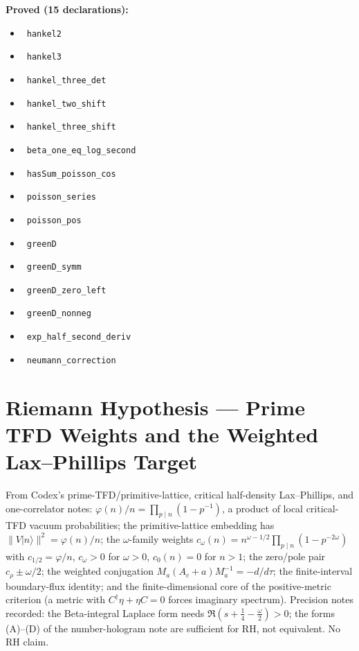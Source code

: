\documentclass{report}
\theoremstyle{definition}
\begin{document}
\noindent\textbf{Proved (15 declarations):}
\begin{itemize}
  \item {}\leanok\ \texttt{hankel2}
  \item {}\leanok\ \texttt{hankel3}
  \item {}\leanok\ \texttt{hankel\_three\_det}
  \item {}\leanok\ \texttt{hankel\_two\_shift}
  \item {}\leanok\ \texttt{hankel\_three\_shift}
  \item {}\leanok\ \texttt{beta\_one\_eq\_log\_second}
  \item {}\leanok\ \texttt{hasSum\_poisson\_cos}
  \item {}\leanok\ \texttt{poisson\_series}
  \item {}\leanok\ \texttt{poisson\_pos}
  \item {}\leanok\ \texttt{greenD}
  \item {}\leanok\ \texttt{greenD\_symm}
  \item {}\leanok\ \texttt{greenD\_zero\_left}
  \item {}\leanok\ \texttt{greenD\_nonneg}
  \item {}\leanok\ \texttt{exp\_half\_second\_deriv}
  \item {}\leanok\ \texttt{neumann\_correction}
\end{itemize}

\section{Riemann Hypothesis --- Prime TFD Weights and the Weighted Lax--Phillips Target}
From Codex's prime-TFD/primitive-lattice, critical half-density Lax--Phillips, and one-correlator notes: $\varphi(n)/n=\prod_{p\mid n}(1-p^{-1})$, a product of local critical-TFD vacuum probabilities; the primitive-lattice embedding has $\|V|n\rangle\|^2=\varphi(n)/n$; the $\omega$-family weights $c_\omega(n)=n^{\omega-1/2}\prod_{p\mid n}(1-p^{-2\omega})$ with $c_{1/2}=\varphi/n$, $c_\omega>0$ for $\omega>0$, $c_0(n)=0$ for $n>1$; the zero/pole pair $c_\rho\pm\omega/2$; the weighted conjugation $M_a(A_c+a)M_a^{-1}=-d/d\tau$; the finite-interval boundary-flux identity; and the finite-dimensional core of the positive-metric criterion (a metric with $C^\dagger\eta+\eta C=0$ forces imaginary spectrum). Precision notes recorded: the Beta-integral Laplace form needs $\Re(s+\tfrac14-\tfrac\omega2)>0$; the forms (A)--(D) of the number-hologram note are sufficient for RH, not equivalent. No RH claim.
\end{document}
